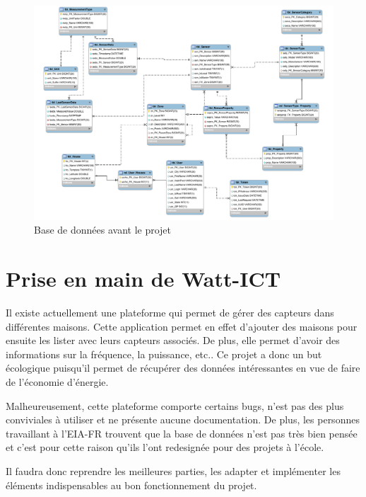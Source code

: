 \begin{figure}[H]
    	\centering
    	\includegraphics[width=\textwidth]{00_media/03_bddV2.pdf}
    	\caption{Base de données avant le projet}
    	\label{gra:bddv2}
\end{figure}


\section{Prise en main de Watt-ICT} %
\label{sub:etat_actuel_du_syst_me}
Il existe actuellement une plateforme qui permet de gérer des capteurs dans différentes maisons. Cette application permet en effet d'ajouter des maisons pour ensuite les lister avec leurs capteurs associés. De plus, elle permet d'avoir des informations sur la fréquence, la puissance, etc.. Ce projet a donc un but écologique puisqu'il permet de récupérer des données intéressantes en vue de faire de l'économie d'énergie.

\medskip

Malheureusement, cette plateforme comporte certains bugs, n'est pas des plus conviviales à utiliser et ne présente aucune documentation. De plus, les personnes travaillant à l'EIA-FR trouvent que la base de données n'est pas très bien pensée et c'est pour cette raison qu'ils l'ont redesignée pour des projets à l'école.

\medskip

Il faudra donc reprendre les meilleures parties, les adapter et implémenter les éléments indispensables au bon fonctionnement du projet.

\medskip

